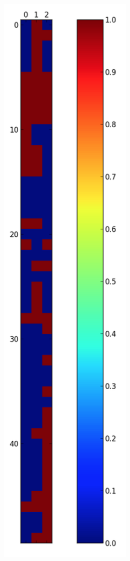 \documentclass[a4paper, oneside]{csthesis}
\begin{document}
\begin{figure}
\begin{subfigure}[b]{0.3\textwidth}
            \caption{}
            \label{fig:dtw-forgeries1}
    \end{subfigure}%
    \qquad
    \begin{subfigure}[b]{0.3\textwidth}
            \centering
            \includegraphics[width=0.8\textwidth]{figures/dtw_forgeries_2.png}

\end{subfigure}
\end{figure}
\end{document}
